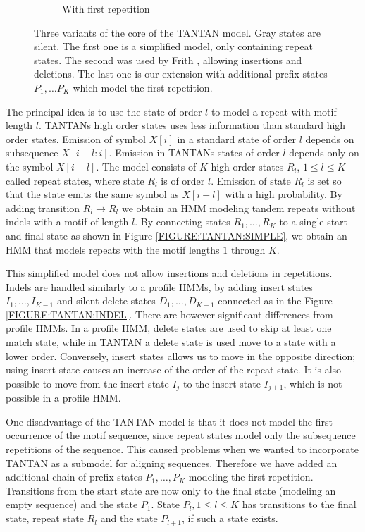 \begin{figure}
\begin{center}
\begin{subfigure}{0.35\textwidth}
\caption{With first repetition}\label{FIGURE:TANTAN:INIT}
\end{subfigure}%
\end{center}
\caption{Three variants of the core of the TANTAN model. Gray states are
silent. The first one is a simplified model, only containing repeat states. The second
was used by Frith \cite{Frith2011}, allowing insertions and deletions.  The last one
is our extension with additional prefix states $P_1, \dots P_K$ which model
the first repetition.}\label{FIGURE:TANTAN}
\end{figure}

The principal idea is to use the state of order $l$ to model a repeat with
motif length $l$. TANTANs high order states uses less information than standard
high order states. Emission of symbol $X[i]$ in a standard state of order $l$
depends on subsequence $X[i-l:i]$.  Emission in TANTANs states of order $l$
depends only on the symbol $X[i-l]$. The model consists of $K$ high-order
states $R_l$, $1\leq l\leq K$ called repeat states, where state $R_l$ is of
order $l$. Emission of state $R_l$ is set so that the state emits the same
symbol as $X[i-l]$ with a high probability. By adding transition $R_l\to R_l$
we obtain an HMM modeling tandem repeats without indels with a motif of length
$l$. By connecting states $R_1,\dots, R_K$ to a single start and final state as
shown in Figure \ref{FIGURE:TANTAN:SIMPLE}, we obtain an HMM that models
repeats with the motif lengths $1$ through $K$.

This simplified model does not allow insertions and deletions in repetitions.
Indels are handled similarly to a profile HMMs, by adding insert states
$I_1,\dots, I_{K-1}$ and silent delete states $D_1, \dots, D_{K-1}$ connected
as in the Figure \ref{FIGURE:TANTAN:INDEL}. There are however significant
differences from profile HMMs.  In a profile HMM, delete states are used to
skip at least one match state, while in TANTAN a delete state is used move to a
state with a lower order. Conversely, insert states allows us to move in the
opposite direction; using insert state causes an increase of the order of the
repeat state.  It is also possible to move from the insert state $I_{j}$ to the
insert state $I_{j+1}$, which is not possible in a profile HMM.

One disadvantage of the TANTAN model is that it does not model the first
occurrence of the motif sequence, since repeat states model only the
subsequence repetitions of the sequence. This caused problems when we wanted to
incorporate TANTAN as a submodel for aligning sequences. Therefore we have
added an additional chain of prefix states $P_1,\dots, P_K$ modeling the first
repetition. Transitions from the start state are now only to the final state
(modeling an empty sequence) and the state $P_1$. State $P_l, 1\leq l\leq K$
has transitions to the final state, repeat state $R_l$ and the state $P_{l+1}$,
if such a state exists.


